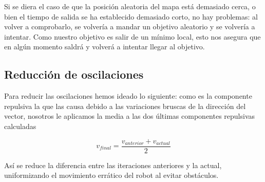 \documentclass[a4paper, 11pt, titlepage]{article}
\begin{document}
    Si se diera el caso de que la posición aleatoria del mapa está demasiado cerca, o bien el tiempo de salida se ha establecido demasiado corto, no hay problemas: al volver a comprobarlo, se volvería a mandar un objetivo aleatorio y se volvería a intentar. Como nuestro objetivo es salir de un mínimo local, esto nos asegura que en algún momento saldrá y volverá a intentar llegar al objetivo.

  \subsection{Reducción de oscilaciones}
    Para reducir las oscilaciones hemos ideado lo siguiente: como es la componente repulsiva la que las causa debido a las variaciones bruscas de la dirección del vector, nosotros le aplicamos la media a las dos últimas componentes repulsivas calculadas

    $$ v_{final} = \frac{v_{anterior} + v_{actual}}{2}$$


    Así se reduce la diferencia entre las iteraciones anteriores y la actual, uniformizando el movimiento errático del robot al evitar obstáculos.
\end{document}
